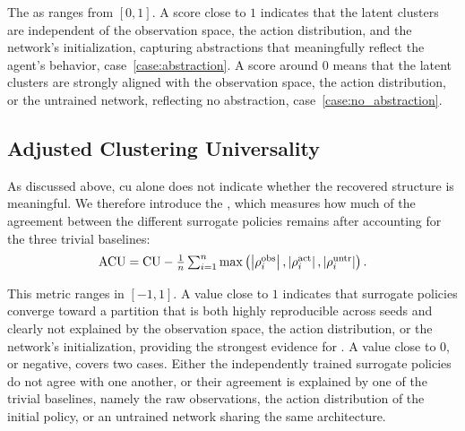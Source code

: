 The \gls{as} ranges from $[0, 1]$.
A score close to $1$ indicates that the latent clusters are independent of the observation space, the action distribution, and the network's initialization, capturing abstractions that meaningfully reflect the agent's behavior, case~\ref{case:abstraction}.
A score around $0$ means that the latent clusters are strongly aligned with the observation space, the action distribution, or the untrained network, reflecting no abstraction, case~\ref{case:no_abstraction}.

\subsection{Adjusted Clustering Universality}
\label{subsec:adjusted_clustering_universality}

As discussed above, \gls{cu} alone does not indicate whether the recovered structure is meaningful.
We therefore introduce the , which measures how much of the agreement between the different surrogate policies remains after accounting for the three trivial baselines:
\begin{align}
\scalebox{1}{%
$\ACU
=
\CU
-
\frac{1}{n}\sum_{i=1}^{n}
\max\left(
\left|\Similarity{obs}{i}\right|,
\left|\Similarity{act}{i}\right|,
\left|\Similarity{untr}{i}\right|
\right).$%
}
\end{align}

This metric ranges in $[-1, 1]$.
A value close to $1$ indicates that surrogate policies converge toward a partition that is both highly reproducible across seeds and clearly not explained by the observation space, the action distribution, or the network's initialization, providing the strongest evidence for \RepresentationConvergenceHypothesisName.
A value close to $0$, or negative, covers two cases.
Either the independently trained surrogate policies do not agree with one another, or their agreement is explained by one of the trivial baselines, namely the raw observations, the action distribution of the initial policy, or an untrained network sharing the same architecture.
